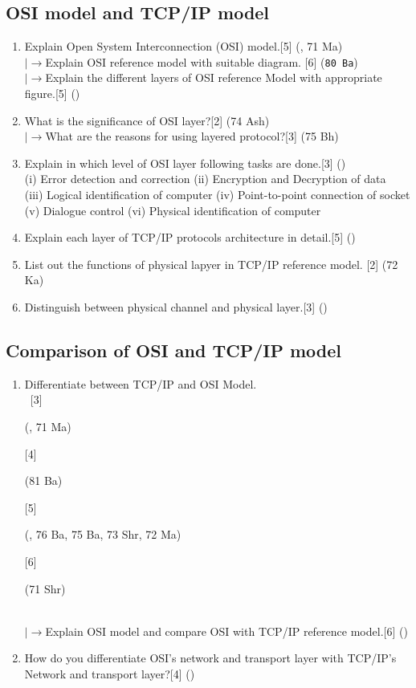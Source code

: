 \documentclass[12pt]{article}
\newcommand{\lb}{\\$\left|\rightarrow\right.$}
\newcommand{\enter}{\\\textcolor{white}{1}}
\begin{document}
	\subsection{OSI model and TCP/IP model}
		\begin{enumerate}[noitemsep, topsep = 0pt]
			\item Explain Open System Interconnection (OSI) model.\hfill[5] (, 71 Ma)
			\lb Explain OSI reference model with suitable diagram. \hfill [6] (\texttt{80 Ba})
			\lb Explain the different layers of OSI reference Model with appropriate figure.\hfill[5] ()
			\item What is the significance of OSI layer?\hfill[2] (74 Ash)
			\lb What are the reasons for using layered protocol?\hfill[3] (75 Bh)
			\item Explain in which level of OSI layer following tasks are done.\hfill[3] ()\\
			(i) Error detection and correction \hspace{20mm} (ii) Encryption and Decryption of data\\
			(iii) Logical identification of computer \hspace{11mm} (iv) Point-to-point connection of socket\\
			(v) Dialogue control \hspace{45mm}(vi) Physical identification of computer
			\item Explain each layer of TCP/IP protocols architecture in detail.\hfill[5] ()

			\item List out the functions of physical lapyer in TCP/IP reference model. \hfill [2] (72 Ka)

			\item Distinguish between physical channel and physical layer.\hfill[3] ()
		\end{enumerate}

		\subsection{Comparison of OSI and TCP/IP model}
			\begin{enumerate}[noitemsep, topsep = 0pt]
				\item Differentiate between TCP/IP and OSI Model.
				\enter\hfill[3] \begin{footnotesize}(, 71 Ma)\end{footnotesize} [4] \begin{footnotesize}(81 Ba)\end{footnotesize} [5] \begin{footnotesize}(, 76 Ba, 75 Ba, 73 Shr, 72 Ma)\end{footnotesize} [6] \begin{footnotesize}(71 Shr)\end{footnotesize} 
				\lb Explain OSI model and compare OSI with TCP/IP reference model.\hfill[6] ()
				\item How do you differentiate OSI's network and transport layer with TCP/IP's Network and transport layer?\hfill[4] ()
			\end{enumerate}
\end{document}

